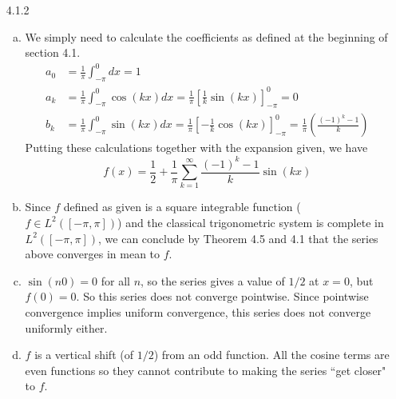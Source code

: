 \documentclass[../../Solutions.tex]{subfiles}
\begin{document}
\begin{itemize}


	\item [4.1.2]
	\begin{enumerate}[(a)]
		\item We simply need to calculate the coefficients as defined at the beginning of section 4.1.
			\begin{equation*} \begin{split} 
				a_0 &= \frac{1}{\pi} \int_{-\pi}^{0} dx = 1 \\
				a_k &= \frac{1}{\pi} \int_{-\pi}^{0} \cos(kx) dx = \frac{1}{\pi}\left[\frac{1}{k}\sin(kx)\right]_{-\pi}^{0} = 0 \\
				b_k &= \frac{1}{\pi} \int_{-\pi}^{0} \sin(kx) dx = \frac{1}{\pi}\left[-\frac{1}{k}\cos(kx)\right]_{-\pi}^{0} = \frac{1}{\pi}\left(\frac{(-1)^k-1}{k}\right)
			\end{split} \end{equation*}
			Putting these calculations together with the expansion given, we have
			\begin{equation*}
				f(x) = \frac{1}{2}+\frac{1}{\pi}\sum_{k=1}^\infty \frac{(-1)^k-1}{k} \sin(kx)
			\end{equation*}
		\item Since $f$ defined as given is a square integrable function ($f \in L^2([-\pi,\pi])$) and the classical trigonometric system is complete in $L^2([-\pi,\pi])$, we can conclude by Theorem 4.5 and 4.1 that the series above converges in mean to $f$.
		\item $\sin(n0) = 0$ for all $n$, so the series gives a value of $1/2$ at $x = 0$, but $f(0)=0$. So this series does not converge pointwise.
			Since pointwise convergence implies uniform convergence, this series does not converge uniformly either.
		\item $f$ is a vertical shift (of $1/2$) from an odd function.
			All the cosine terms are even functions so they cannot contribute to making the series ``get closer" to $f$.
	\end{enumerate}
	

\end{itemize}
\end{document}
